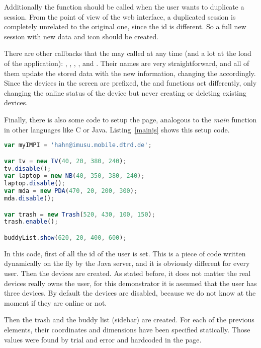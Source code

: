 Additionally the  function should be called when the user wants to duplicate a session.
From the point of view of the web interface, a duplicated session is completely unrelated to the original one, since the id is different.
So a full new session with new data and icon should be created.

There are other callbacks that the  may called at any time (and a lot at the load of the application): , , , ,  and .
Their names are very straightforward, and all of them update the stored data with the new information, changing the  accordingly.
Since the devices in the screen are prefixed, the  and  functions act differently, only changing the online status of the device but never creating or deleting existing devices.

Finally, there is also some  code to setup the page, analogous to the \emph{main} function in other languages like C or Java.
Listing~\vref{mainjs} shows this setup code.

\begin{lstlisting}[float=htbp,label=mainjs,language=javascript,caption=Setup code] % javascript
var myIMPI = 'hahn@imusu.mobile.dtrd.de';

var tv = new TV(40, 20, 380, 240);
tv.disable();
var laptop = new NB(40, 350, 380, 240);
laptop.disable();
var mda = new PDA(470, 20, 200, 300);
mda.disable();

var trash = new Trash(520, 430, 100, 150);
trash.enable();

buddyList.show(620, 20, 400, 600);
\end{lstlisting}

In this code, first of all the id of the user is set. This is a piece of code written dynamically on the fly by the Java server, and it is obviously different for every user.
Then the devices are created.
As stated before, it does not matter the real devices really owns the user, for this demonstrator it is assumed that the user has three devices.
By default the devices are disabled, because we do not know at the moment if they are online or not.

Then the trash and the buddy list (sidebar) are created.
For each of the previous elements, their coordinates and dimensions have been specified statically.
Those values were found by trial and error and hardcoded in the page.


